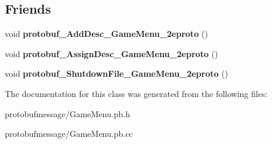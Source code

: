 \subsection*{Friends}
\begin{DoxyCompactItemize}
\item 
\hypertarget{class_game_menu_adab92a19f73074ecd5246095c9c960b4}{void {\bfseries protobuf\-\_\-\-Add\-Desc\-\_\-\-Game\-Menu\-\_\-2eproto} ()}\label{class_game_menu_adab92a19f73074ecd5246095c9c960b4}

\item 
\hypertarget{class_game_menu_a510004e21d3b33f46c1dd043a543e933}{void {\bfseries protobuf\-\_\-\-Assign\-Desc\-\_\-\-Game\-Menu\-\_\-2eproto} ()}\label{class_game_menu_a510004e21d3b33f46c1dd043a543e933}

\item 
\hypertarget{class_game_menu_aa91d1c6168e6662eb7667848e4cef2c3}{void {\bfseries protobuf\-\_\-\-Shutdown\-File\-\_\-\-Game\-Menu\-\_\-2eproto} ()}\label{class_game_menu_aa91d1c6168e6662eb7667848e4cef2c3}

\end{DoxyCompactItemize}


The documentation for this class was generated from the following files\-:\begin{DoxyCompactItemize}
\item 
protobufmessage/Game\-Menu.\-pb.\-h\item 
protobufmessage/Game\-Menu.\-pb.\-cc\end{DoxyCompactItemize}

